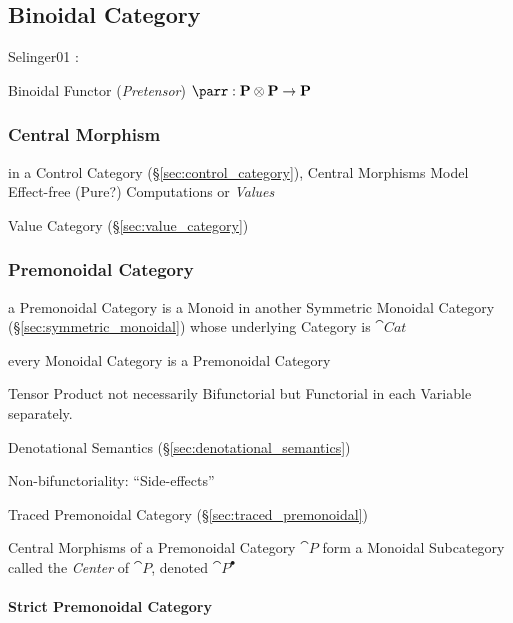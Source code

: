 \subsection{Binoidal Category}\label{sec:binoidal_category}

Selinger01 \cite{selinger01}:

Binoidal Functor (\emph{Pretensor}) $\parr : \cat{P} \otimes \cat{P}
\rightarrow \cat{P}$



\subsubsection{Central Morphism}\label{sec:central_morphism}

in a Control Category (\S\ref{sec:control_category}), Central
Morphisms Model Effect-free (Pure?) Computations or \emph{Values}

Value Category (\S\ref{sec:value_category})


\subsubsection{Premonoidal Category}\label{sec:premonoidal_category}

a Premonoidal Category is a Monoid in another Symmetric Monoidal
Category (\S\ref{sec:symmetric_monoidal}) whose underlying Category is
$\cat{Cat}$

every Monoidal Category is a Premonoidal Category

Tensor Product not necessarily Bifunctorial but Functorial in each
Variable separately.

Denotational Semantics (\S\ref{sec:denotational_semantics})

Non-bifunctoriality: ``Side-effects'' \cite{jacobs-heunen-hasuo09}

Traced Premonoidal Category (\S\ref{sec:traced_premonoidal})

Central Morphisms of a Premonoidal Category $\cat{P}$ form a Monoidal
Subcategory called the \emph{Center} of $\cat{P}$, denoted
$\cat{P}^\bullet$



\paragraph{Strict Premonoidal Category}\label{sec:strict_premonoidal}
\hfill

